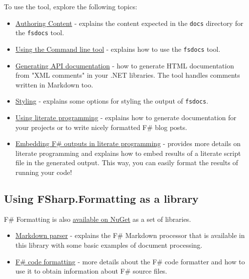 \documentclass{article}
\begin{document}
To use the tool, explore the following topics:
\begin{itemize}
\item 

\href{content.html}{Authoring Content} - explains the content expected in the \texttt{docs} directory for the \texttt{fsdocs} tool.

\item 

\href{commandline.html}{Using the Command line tool} - explains how to use the \texttt{fsdocs} tool.

\item 

\href{apidocs.html}{Generating API documentation} - how to generate HTML documentation
from "XML comments" in your .NET libraries. The tool handles comments written in
Markdown too.

\item 

\href{styling.html}{Styling} - explains some options for styling the output of \texttt{fsdocs}.

\item 

\href{literate.html}{Using literate programming} - explains how to generate documentation
for your projects or to write nicely formatted F\# blog posts.

\item 

\href{evaluation.html}{Embedding F\# outputs in literate programming} - provides more details on literate programming and
explains how to embed results of a literate script file in the generated output. This way,
you can easily format the results of running your code!

\end{itemize}

\subsection*{Using FSharp.Formatting as a library}



F\# Formatting is also \href{https://nuget.org/packages/FSharp.Formatting}{available on NuGet} as a set of libraries.
\begin{itemize}
\item 

\href{markdown.html}{Markdown parser} - explains the F\# Markdown
processor that is available in this library with some basic examples of
document processing.

\item 

\href{codeformat.html}{F\# code formatting} - more details about the F\# code
formatter and how to use it to obtain information about F\# source files.

\end{itemize}
\end{document}

